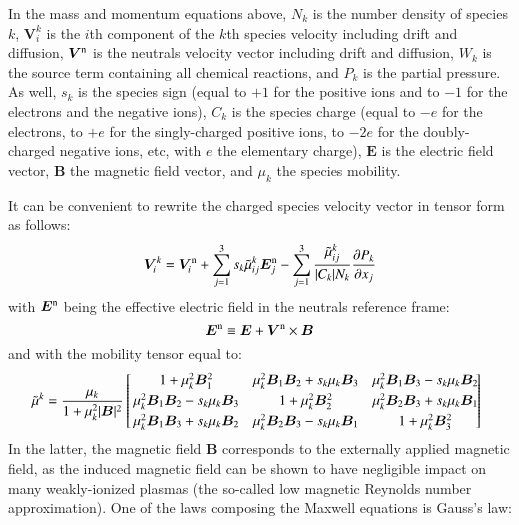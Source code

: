 \documentclass{warpdoc}
\newcommand{\alb}{\vspace{0.1cm}\\} %
\newcommand{\mfd}{\displaystyle}
\newcommand{\nd}{3}
\renewcommand{\vec}[1]{\bm{#1}}
\begin{document}
In the mass and momentum equations above, $N_k$ is the number density of species $k$, $\vec{V}_i^k$ is the $i$th component of the $k$th species velocity including drift and diffusion, $\vec{V}^{\rm n}$ is the neutrals velocity vector including drift and diffusion, $W_k$ is the source term containing all chemical reactions, and $P_k$ is the partial pressure. As well, $s_k$ is the species sign  (equal to $+1$ for the positive ions and to $-1$ for the electrons and the negative ions), $C_k$ is the species charge  (equal to $-e$ for the electrons, to $+e$ for the singly-charged positive ions, to $-2e$ for the doubly-charged negative ions, etc, with $e$ the elementary charge), $\vec{E}$ is the electric field vector, $\vec{B}$ the magnetic field vector, and $\mu_k$ the species mobility.
 
It can be convenient to rewrite the  charged species velocity vector in tensor form as follows:
%
\begin{equation}
  \vec{V}^{k}_i = \vec{V}^{\rm n}_i+\sum_{j=1}^\nd s_k \wtilde{\mu}^k_{ij}  \vec{E}_j^{\rm n}
             - \sum_{j=1}^\nd  \frac{\wtilde{\mu}^{k}_{ij}}{|C_k| N_k} \frac{\partial P_k}{\partial x_j}
  \label{eqn:V}
\end{equation}
%
with $\vec{E}^{\rm n}$ being the effective electric field in the neutrals reference frame:
%
\begin{equation}
\vec{E}^{\rm n} \equiv \vec{E}+\vec{V}^{\rm n} \times \vec{B}
\label{eqn:En}
\end{equation}
%
and with the mobility tensor equal to:
%
\begin{equation}
\!\!\!
\begin{array}{l}\mfd
\wtilde{\mu}^k  =\frac{\mu_k}{1+\mu_k^2|\vec{B}|^2}\left[\!\!\begin{array}{ccc} 
      1+\mu_k^2 \vec{B}_1^2 
     & \mu_k^2\vec{B}_1\vec{B}_2+s_k \mu_k \vec{B}_3  
     & \mu_k^2\vec{B}_1\vec{B}_3-s_k \mu_k \vec{B}_2 \alb
      \mu_k^2\vec{B}_1\vec{B}_2-s_k\mu_k\vec{B}_3 & 1+\mu_k^2\vec{B}_2^2 &  \mu_k^2\vec{B}_2\vec{B}_3+s_k\mu_k\vec{B}_1  \alb
      \mu_k^2\vec{B}_1\vec{B}_3 +s_k\mu_k\vec{B}_2 & \mu_k^2 \vec{B}_2\vec{B}_3-s_k\mu_k\vec{B}_1  & 1+\mu_k^2\vec{B}_3^2 
    \end{array} \!\!\!\!\right]
\end{array}
\label{eqn:mutilde}
\end{equation}
%
In the latter, the magnetic field $\vec{B}$ corresponds to the externally applied magnetic field, as the induced magnetic field can be shown to have negligible impact on many weakly-ionized plasmas (the so-called low magnetic Reynolds number approximation). One of the laws composing the Maxwell equations is Gauss's law:
\end{document}

